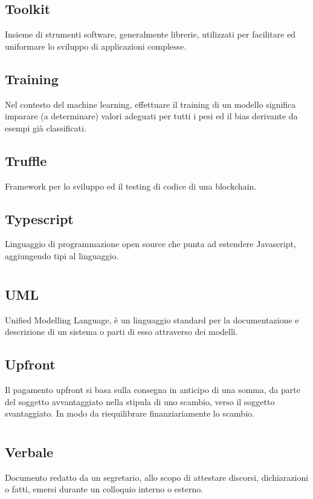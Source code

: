 	\subsection*{Toolkit}
	Insieme di strumenti software, generalmente librerie, utilizzati per facilitare ed uniformare lo sviluppo di applicazioni complesse.
	\subsection*{Training}
	Nel contesto del machine learning, effettuare il training di un modello significa imparare (a determinare) valori adeguati per tutti i pesi ed il bias derivante da esempi già classificati.
	\subsection*{Truffle}
	Framework per lo sviluppo ed il testing di codice di una blockchain. 
	\subsection*{Typescript}
	Linguaggio di programmazione open source che punta ad estendere Javascript, aggiungendo tipi al linguaggio.
\pagebreak
\section[U]{}
	\subsection*{UML}
	Unified Modelling Language, è un linguaggio  standard per la documentazione e descrizione di un sistema o parti di esso attraverso dei modelli.
	\subsection*{Upfront}
	Il pagamento upfront si basa sulla consegna in anticipo di una somma, da parte del soggetto avvantaggiato nella stipula di uno scambio, verso il soggetto svantaggiato. In modo da riequilibrare finanziariamente lo scambio.
\pagebreak
\section[V]{}
	\subsection*{Verbale}
	Documento redatto da un segretario, allo scopo di attestare discorsi, dichiarazioni o fatti, emersi durante un colloquio interno o esterno.
